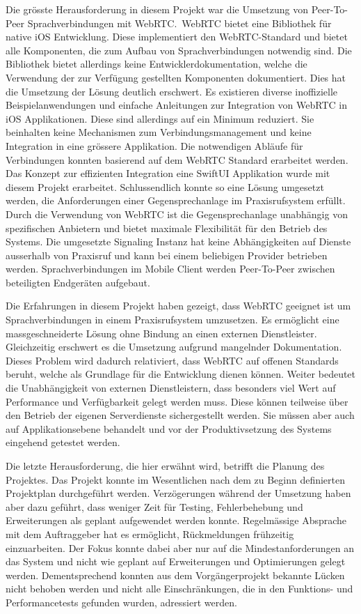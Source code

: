 Die grösste Herausforderung in diesem Projekt war die Umsetzung von Peer-To-Peer Sprachverbindungen mit WebRTC.\
WebRTC bietet eine Bibliothek für native iOS Entwicklung.
Diese implementiert den WebRTC-Standard und bietet alle Komponenten, die zum Aufbau von Sprachverbindungen notwendig sind.
Die Bibliothek bietet allerdings keine Entwicklerdokumentation, welche die Verwendung der zur Verfügung gestellten Komponenten dokumentiert.
Dies hat die Umsetzung der Lösung deutlich erschwert.
Es existieren diverse inoffizielle Beispielanwendungen und einfache Anleitungen zur Integration von WebRTC in iOS Applikationen.
Diese sind allerdings auf ein Minimum reduziert.
Sie beinhalten keine Mechanismen zum Verbindungsmanagement und keine Integration in eine grössere Applikation.
Die notwendigen Abläufe für Verbindungen konnten basierend auf dem WebRTC Standard erarbeitet werden.
Das Konzept zur effizienten Integration eine SwiftUI Applikation wurde mit diesem Projekt erarbeitet.
Schlussendlich konnte so eine Lösung umgesetzt werden, die Anforderungen einer Gegensprechanlage im Praxisrufsystem erfüllt.
Durch die Verwendung von WebRTC ist die Gegensprechanlage unabhängig von spezifischen Anbietern und bietet maximale Flexibilität für den Betrieb des Systems.
Die umgesetzte Signaling Instanz hat keine Abhängigkeiten auf Dienste ausserhalb von Praxisruf und kann bei einem beliebigen Provider betrieben werden.
Sprachverbindungen im Mobile Client werden Peer-To-Peer zwischen beteiligten Endgeräten aufgebaut.

Die Erfahrungen in diesem Projekt haben gezeigt, dass WebRTC geeignet ist um Sprachverbindungen in einem Praxisrufsystem umzusetzen.
Es ermöglicht eine massgeschneiderte Lösung ohne Bindung an einen externen Dienstleister.
Gleichzeitig erschwert es die Umsetzung aufgrund mangelnder Dokumentation.
Dieses Problem wird dadurch relativiert, dass WebRTC auf offenen Standards beruht, welche als Grundlage für die Entwicklung dienen können.
Weiter bedeutet die Unabhängigkeit von externen Dienstleistern, dass besonders viel Wert auf Performance und Verfügbarkeit gelegt werden muss.
Diese können teilweise über den Betrieb der eigenen Serverdienste sichergestellt werden.
Sie müssen aber auch auf Applikationsebene behandelt und vor der Produktivsetzung des Systems eingehend getestet werden.

Die letzte Herausforderung, die hier erwähnt wird, betrifft die Planung des Projektes.
Das Projekt konnte im Wesentlichen nach dem zu Beginn definierten Projektplan durchgeführt werden.
Verzögerungen während der Umsetzung haben aber dazu geführt, dass weniger Zeit für Testing, Fehlerbehebung und Erweiterungen als geplant aufgewendet werden konnte.
Regelmässige Absprache mit dem Auftraggeber hat es ermöglicht, Rückmeldungen frühzeitig einzuarbeiten.
Der Fokus konnte dabei aber nur auf die Mindestanforderungen an das System und nicht wie geplant auf Erweiterungen und Optimierungen gelegt werden.
Dementsprechend konnten aus dem Vorgängerprojekt bekannte Lücken nicht behoben werden und nicht alle Einschränkungen, die in den Funktions- und Performancetests gefunden wurden, adressiert werden.

